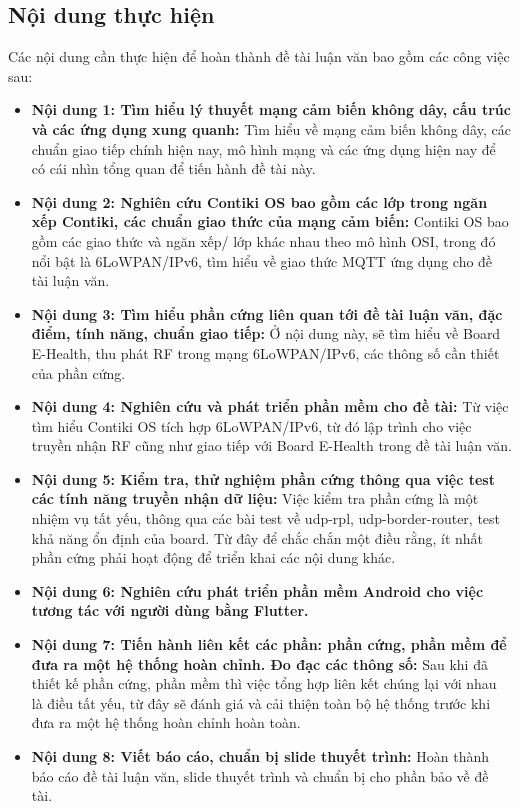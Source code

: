 \documentclass{report}
\begin{document}
\subsection{Nội dung thực hiện}
Các nội dung cần thực hiện để hoàn thành đề tài luận văn bao gồm các công việc sau:
\begin{itemize}
\item \textbf{Nội dung 1: Tìm hiểu lý thuyết mạng cảm biến không dây, cấu trúc và các ứng
dụng xung quanh:} Tìm hiểu về mạng cảm biến không dây, các chuẩn giao tiếp chính hiện
nay, mô hình mạng và các ứng dụng hiện nay để có cái nhìn tổng quan để tiến hành đề tài này.
\item \textbf{Nội dung 2: Nghiên cứu Contiki OS bao gồm các lớp trong ngăn xếp Contiki,
các chuẩn giao thức của mạng cảm biến:} Contiki OS bao gồm các giao thức và ngăn
xếp/ lớp khác nhau theo mô hình OSI, trong đó nổi bật là 6LoWPAN/IPv6, tìm hiểu về giao thức MQTT ứng dụng cho đề tài luận văn.
\item \textbf{Nội dung 3: Tìm hiểu phần cứng liên quan tới đề tài luận văn, đặc điểm, tính năng, chuẩn giao tiếp:} Ở nội dung này, sẽ tìm hiểu về Board E-Health, thu phát RF trong mạng 6LoWPAN/IPv6, các thông số cần thiết của phần cứng.
\item \textbf{Nội dung 4: Nghiên cứu và phát triển phần mềm cho đề tài:} Từ việc tìm hiểu Contiki OS
tích hợp 6LoWPAN/IPv6, từ đó lập trình cho việc truyền nhận RF cũng như giao tiếp với Board E-Health trong đề tài luận văn.
\item \textbf{Nội dung 5: Kiểm tra, thử nghiệm phần cứng thông qua việc test
các tính năng truyền nhận dữ liệu:} Việc kiểm tra phần cứng là một nhiệm vụ tất yếu, thông qua các bài test về udp-rpl, udp-border-router, test khả năng ổn định của board. Từ đây để chắc chắn một điều rằng, ít nhất phần cứng phải hoạt động để triển khai các nội dung khác.
\item \textbf{Nội dung 6: Nghiên cứu phát triển phần mềm Android cho việc tương tác với người
dùng bằng Flutter.}
\item \textbf{Nội dung 7: Tiến hành liên kết các phần: phần cứng, phần mềm để
đưa ra một hệ thống hoàn chỉnh. Đo đạc các thông số:} Sau khi đã thiết kế phần cứng, phần mềm thì việc tổng hợp liên kết chúng lại với nhau là điều tất yếu, từ đây sẽ đánh giá và cải thiện toàn bộ hệ thống trước khi đưa ra một hệ thống hoàn chỉnh hoàn toàn.
\item \textbf{Nội dung 8: Viết báo cáo, chuẩn bị slide thuyết trình:} Hoàn thành báo cáo đề tài
luận văn, slide thuyết trình và chuẩn bị cho phần bảo về đề tài.
\end{itemize}
\end{document}
